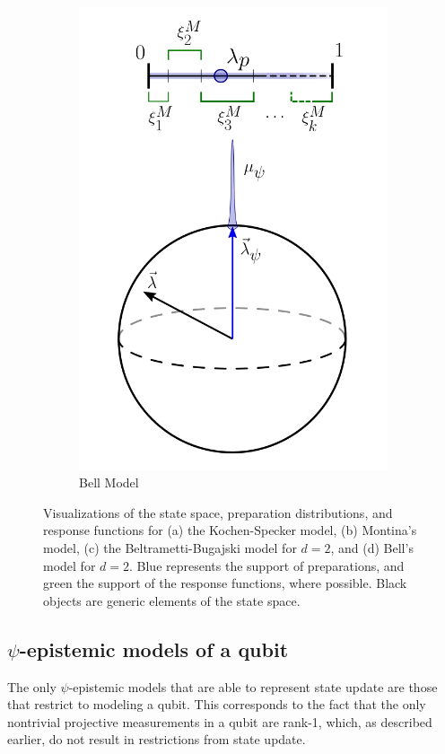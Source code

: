 \documentclass[%
 reprint,
superscriptaddress,
nofootinbib,
 amsmath,amssymb,
 prx, 
 accepted=2019-09-27,
]{quantumarticle}
\begin{document}
\begin{figure}[t]
\begin{subfigure}[t]{0.24\textwidth}
 \includegraphics[width=\textwidth]{Bell_model_v2.png}
 \caption{Bell Model}
 \label{fig:Bellmodel}
 \end{subfigure}
 \caption{Visualizations of the state space, preparation
   distributions, and response functions for (a) the Kochen-Specker
   model, (b) Montina's model, (c) the Beltrametti-Bugajski model for
   $d=2$, and (d) Bell's model for $d=2$. Blue represents the support
   of preparations, and green the support of the response functions,
   where possible. Black objects are generic elements of the state
   space.}
  \label{fig:models}
\end{figure} 

\subsection{$\psi$-epistemic models of a qubit}
The only $\psi$-epistemic models that are able to represent state
update are those that restrict to modeling a qubit. This corresponds
to the fact that the only nontrivial projective measurements in a
qubit are rank-1, which, as described earlier, do not result in
restrictions from state update.
\end{document}
